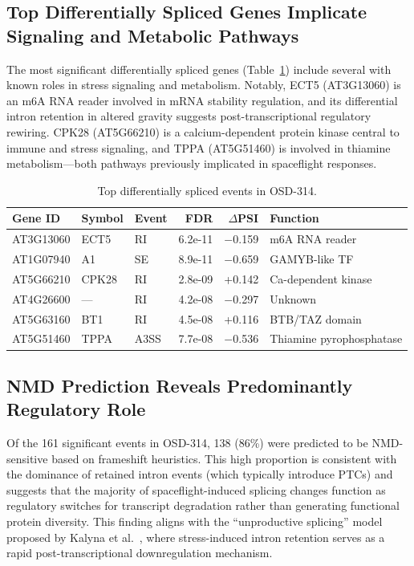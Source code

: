 \documentclass[12pt,a4paper]{article}
\begin{document}
\subsection{Top Differentially Spliced Genes Implicate Signaling and Metabolic Pathways}

The most significant differentially spliced genes (Table~\ref{tab:top_genes}) include several with known roles in stress signaling and metabolism. Notably, ECT5 (AT3G13060) is an m6A RNA reader involved in mRNA stability regulation, and its differential intron retention in altered gravity suggests post-transcriptional regulatory rewiring. CPK28 (AT5G66210) is a calcium-dependent protein kinase central to immune and stress signaling, and TPPA (AT5G51460) is involved in thiamine metabolism---both pathways previously implicated in spaceflight responses.

\begin{table}[h]
\centering
\caption{Top differentially spliced events in OSD-314.}
\label{tab:top_genes}
\begin{tabular}{lllrrl}
\toprule
\textbf{Gene ID} & \textbf{Symbol} & \textbf{Event} & \textbf{FDR} & \textbf{$\Delta$PSI} & \textbf{Function} \\
\midrule
AT3G13060 & ECT5 & RI & 6.2e-11 & $-$0.159 & m6A RNA reader \\
AT1G07940 & A1 & SE & 8.9e-11 & $-$0.659 & GAMYB-like TF \\
AT5G66210 & CPK28 & RI & 2.8e-09 & +0.142 & Ca-dependent kinase \\
AT4G26600 & --- & RI & 4.2e-08 & $-$0.297 & Unknown \\
AT5G63160 & BT1 & RI & 4.5e-08 & +0.116 & BTB/TAZ domain \\
AT5G51460 & TPPA & A3SS & 7.7e-08 & $-$0.536 & Thiamine pyrophosphatase \\
\bottomrule
\end{tabular}
\end{table}

\subsection{NMD Prediction Reveals Predominantly Regulatory Role}

Of the 161 significant events in OSD-314, 138 (86\%) were predicted to be NMD-sensitive based on frameshift heuristics. This high proportion is consistent with the dominance of retained intron events (which typically introduce PTCs) and suggests that the majority of spaceflight-induced splicing changes function as regulatory switches for transcript degradation rather than generating functional protein diversity. This finding aligns with the ``unproductive splicing'' model proposed by Kalyna et al.~\cite{kalyna2012}, where stress-induced intron retention serves as a rapid post-transcriptional downregulation mechanism.
\end{document}
